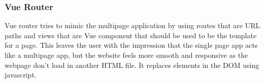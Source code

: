 \subsubsection{Vue Router}
Vue router\cite{VUEROUTER} tries to mimic the multipage application by using routes that are URL paths and views that are Vue component that should be used to be the template for a page. This leaves the user with the impression that the single page app acts like a multipage app, but the website feels more smooth and responsive as the webpage don't load in another HTML file. It replaces elements in the DOM using javascript.